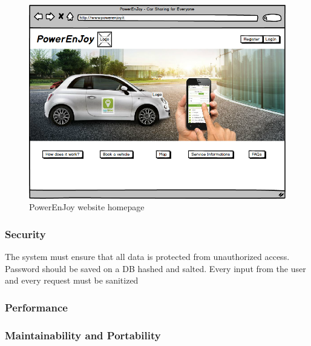 \documentclass[english]{article}
\begin{document}
\begin{itemize}
\begin{figure}[t]
	\centering
\includegraphics[scale=0.4]{img/webhome}
	\caption{PowerEnJoy website homepage}
\end{figure}




\subsubsection{Security}

The system must ensure that all data is protected from unauthorized
access. Password should be saved on a DB hashed and salted.
Every input from the user and every request must be sanitized 

\end{itemize}

\pagebreak{}




\subsubsection{Performance}


\subsubsection{Maintainability and Portability}

\pagebreak{}
\end{document}
